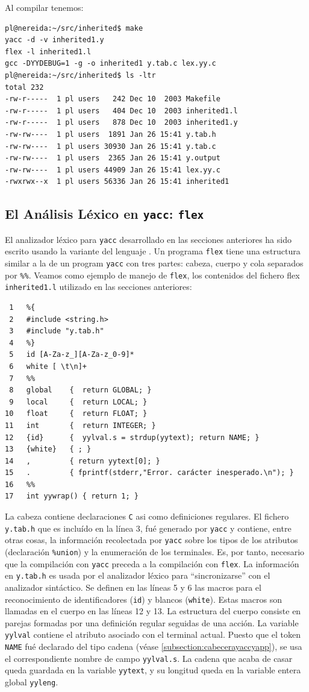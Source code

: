 Al compilar tenemos:
\begin{verbatim}
pl@nereida:~/src/inherited$ make
yacc -d -v inherited1.y
flex -l inherited1.l
gcc -DYYDEBUG=1 -g -o inherited1 y.tab.c lex.yy.c
pl@nereida:~/src/inherited$ ls -ltr
total 232
-rw-r-----  1 pl users   242 Dec 10  2003 Makefile
-rw-r-----  1 pl users   404 Dec 10  2003 inherited1.l
-rw-r-----  1 pl users   878 Dec 10  2003 inherited1.y
-rw-rw----  1 pl users  1891 Jan 26 15:41 y.tab.h
-rw-rw----  1 pl users 30930 Jan 26 15:41 y.tab.c
-rw-rw----  1 pl users  2365 Jan 26 15:41 y.output
-rw-rw----  1 pl users 44909 Jan 26 15:41 lex.yy.c
-rwxrwx--x  1 pl users 56336 Jan 26 15:41 inherited1
\end{verbatim}

\subsection{El Análisis Léxico en {\tt yacc}: {\tt flex}}
\label{subsection:flex}
El analizador léxico para \verb|yacc| desarrollado
en las secciones anteriores ha sido escrito
usando la variante  del lenguaje . Un programa
\verb|flex| tiene una estructura similar a la 
de un program \verb|yacc| con tres partes: cabeza, cuerpo
y cola separados por \verb|%%|. Veamos como ejemplo de manejo de
\verb|flex|, los contenidos
del fichero flex \verb|inherited1.l| utilizado en las secciones
anteriores:

\begin{verbatim}
 1   %{
 2   #include <string.h>
 3   #include "y.tab.h"
 4   %}
 5   id [A-Za-z_][A-Za-z_0-9]*
 6   white [ \t\n]+
 7   %%
 8   global    {  return GLOBAL; }
 9   local     {  return LOCAL; }
10   float     {  return FLOAT; }
11   int       {  return INTEGER; }
12   {id}      {  yylval.s = strdup(yytext); return NAME; }
13   {white}   { ; }
14   ,         { return yytext[0]; }
15   .         { fprintf(stderr,"Error. carácter inesperado.\n"); }
16   %%
17   int yywrap() { return 1; }
\end{verbatim}
La cabeza contiene declaraciones \verb|C| asi como definiciones
regulares. El fichero \verb|y.tab.h| que es incluído en la línea
3, fué generado 
por \verb|yacc| y contiene, entre otras cosas,
la información recolectada
por \verb|yacc| sobre los tipos de los atributos 
(declaración \verb|%union|) y la enumeración de los terminales.
Es, por tanto, necesario que la compilación con \verb|yacc|
preceda a la compilación con \verb|flex|.
La información en \verb|y.tab.h| es usada por el analizador léxico
para ``sincronizarse'' con el analizador sintáctico.
Se definen en las líneas 5 y 6 las 
macros para el reconocimiento de identificadores (\verb|id|)
y blancos (\verb|white|). Estas macros son llamadas en el cuerpo
en las líneas 12 y 13. 
La estructura del cuerpo
consiste en parejas formadas por una definición
regular seguidas de una acción.
La variable \verb|yylval| contiene el atributo asociado
con el terminal actual. Puesto que el token \verb|NAME|
fué declarado del tipo cadena (véase \ref{subsection:cabecerayaccyapp}), 
se usa el correspondiente
nombre de campo \verb|yylval.s|.
La cadena que acaba de casar queda guardada en la variable
\verb|yytext|, y su longitud queda en la
variable entera global \verb|yyleng|.

